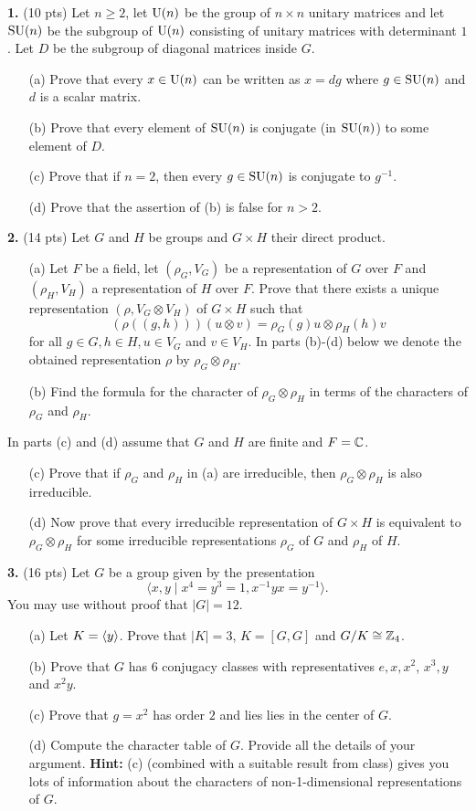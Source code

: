 \documentclass[12pt]{amsart}
\begin{document}
\skv
{\bf 1.} (10 pts) Let $n\geq 2$, let ${\rm U}(n)$ be the group
of $n\times n$ unitary matrices and let
${\rm SU}(n)$ be the subgroup of ${\rm U}(n)$ consisting of unitary matrices with determinant $1$.
Let $D$ be the subgroup of diagonal matrices inside $G$.
\begin{itemize} 
\item[(a)] Prove that every $x\in {\rm U}(n)$ can be written
as $x=dg$ where $g\in {\rm SU}(n)$ and $d$ is a scalar matrix. 
\item[(b)] Prove that every element of ${\rm SU}(n)$ is conjugate (in ${\rm SU}(n)$) to some element of $D$.
\item[(c)] Prove that if $n=2$, then every $g\in {\rm SU}(n)$ is conjugate to $g^{-1}$.
\item[(d)] Prove that the assertion of (b) is false for $n>2$.
\end{itemize}
\skv
{\bf 2.} (14 pts) Let $G$ and $H$ be groups and $G\times H$ their direct product.
\begin{itemize}
\item[(a)] Let $F$ be a field, let $(\rho_G,V_G)$ be a representation of $G$ over $F$ and $(\rho_H,V_H)$ a representation of $H$ over $F$. Prove that there exists a unique representation $(\rho, V_G\otimes V_H)$
of $G\times H$ such that $$(\rho((g,h)))(u\otimes v)=\rho_G(g)u\otimes \rho_H(h)v$$ for all $g\in G,h\in H,
u\in V_G$ and $v\in V_H$. In parts (b)-(d) below we denote the obtained representation $\rho$
by $\rho_G\otimes \rho_H$.
\item[(b)] Find the formula for the character of $\rho_G\otimes \rho_H$ in terms of the characters of $\rho_G$ and $\rho_H$.
\end{itemize}
In parts (c) and (d) assume that $G$ and $H$ are finite and $F={\mathbb C}$. 
\begin{itemize}
\item[(c)] Prove that if $\rho_G$ and $\rho_H$ in (a) are irreducible, then $\rho_G\otimes \rho_H$ is also irreducible. 
\item[(d)] Now prove that every irreducible representation of $G\times H$ is equivalent to $\rho_G\otimes \rho_H$ for some irreducible representations $\rho_G$ of $G$ and $\rho_H$ of $H$.
\end{itemize}
\skv
{\bf 3.} (16 pts) Let $G$ be a group given by the presentation $$\langle x,y\mid x^4=y^3=1, x^{-1}yx=y^{-1}\rangle.$$
You may use without proof that $|G|=12$.
\begin{itemize}
\item[(a)] Let $K={\langle} y{\rangle}$. Prove that $|K|=3$, $K=[G,G]$
and $G/K\cong {\mathbb Z}_4$.
\item[(b)] Prove that $G$ has $6$ conjugacy classes with representatives $e,x,x^2$, $x^3,y$ and $x^2 y$.
\item[(c)] Prove that $g=x^2$ has order $2$ and lies
lies in the center of $G$.
\item[(d)] Compute the character table of $G$. Provide all the details of your argument. {\bf Hint:} (c) (combined with a suitable
result from class) gives you lots of information about the characters of non-1-dimensional representations of $G$.
\end{itemize}
\end{document}
